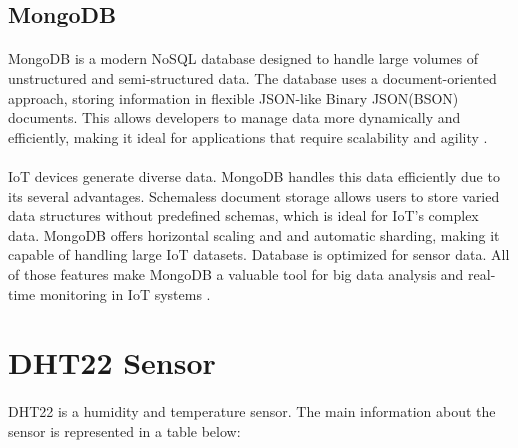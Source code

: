 \subsection{MongoDB}%
\paragraph{}MongoDB is a modern NoSQL database designed to handle large volumes of unstructured and semi-structured data. The database uses a document-oriented approach, storing information in flexible JSON-like Binary JSON(BSON) documents. This allows developers to manage data more dynamically and efficiently, making it ideal for applications that require scalability and agility \cite{mongodb:doc_1}.
\paragraph{}IoT devices generate diverse data. MongoDB handles this data efficiently due to its several advantages. Schemaless document storage allows users to store varied data structures without predefined schemas, which is ideal for IoT's complex data. MongoDB offers horizontal scaling and and automatic sharding, making it capable of handling large IoT datasets. Database is optimized for sensor data. All of those features make MongoDB a valuable tool for big data analysis and real-time monitoring in IoT systems \cite{mongodb:iot}. 

\newpage
\section{DHT22 Sensor}

\paragraph{}DHT22 is a humidity and temperature sensor. The main information about the sensor is represented in a table below:

